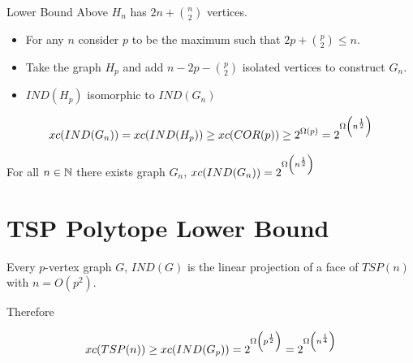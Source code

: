 \documentclass[aspectratio=1610]{beamer}
\begin{document}
\begin{frame}{Lower Bound}
	Above $H_n$ has $2n+\binom{n}2$ vertices.\pause\vspace*{5mm}
	
	\begin{itemize}
		\item For any $n$ consider $p$ to be the maximum such that $2p+\binom{p}2\leq n$. \vspace*{5mm}\pause
		
		\item Take the graph $H_p$ and add $n-2p-\binom{p}2$ isolated vertices to construct $G_n$. \vspace*{5mm}\pause
		
		\item $IND(H_p)$ isomorphic to $IND(G_n)$
	\end{itemize}\pause

	$$xc(IND(G_n))=xc(IND(H_p))\geq xc(COR(p))\geq 2^{\Omega(p)}=2^{\Omega\left(n^{\frac12}\right)}$$
\begin{theorem}
	For all $n\in\mathbb{N}$ there exists graph $G_n$, $xc(IND(G_n))=2^{\Omega\left(n^{\frac12}\right)}$
\end{theorem}
\end{frame}
\section{TSP Polytope Lower Bound}
\begin{frame}
	\begin{theorem}
		Every $p$-vertex graph $G$, $IND(G)$ is the linear projection of a face of $TSP(n)$ with $n=O(p^2)$.
	\end{theorem}
\vspace*{5mm}\pause

	Therefore 
	
	$$xc(TSP(n))\geq xc(IND(G_p))=2^{\Omega\left(p^{\frac12}\right)}=2^{\Omega\left(n^{\frac14}\right)}$$
\end{frame}

\end{document}
